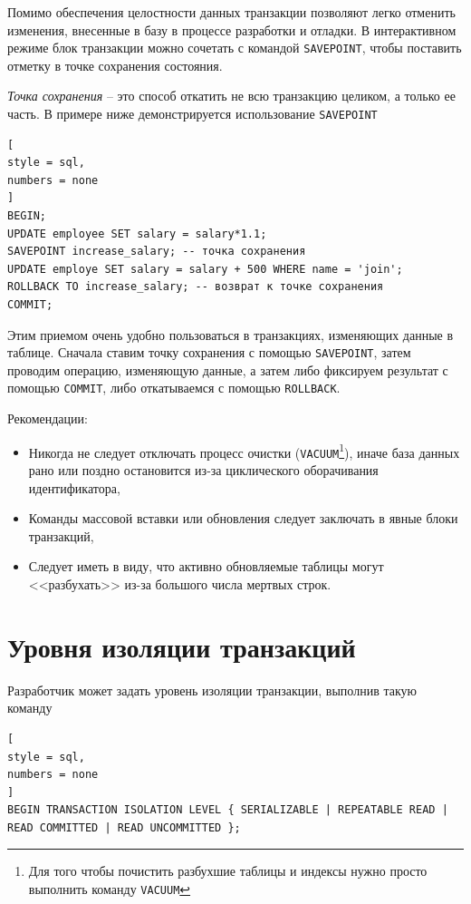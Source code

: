 \documentclass[%
	11pt,
	a4paper,
	utf8,
		]{article}
\begin{document}
Помимо обеспечения целостности данных транзакции позволяют легко отменить изменения, внесенные в базу в процессе разработки и отладки. В интерактивном режиме блок транзакции можно сочетать с командой \texttt{SAVEPOINT}, чтобы поставить отметку в точке сохранения состояния.

\emph{Точка сохранения} -- это способ откатить не всю транзакцию целиком, а только ее часть. В примере ниже демонстрируется использование \texttt{SAVEPOINT}

\begin{lstlisting}[
style = sql,
numbers = none
]
BEGIN;
UPDATE employee SET salary = salary*1.1;
SAVEPOINT increase_salary; -- точка сохранения
UPDATE employe SET salary = salary + 500 WHERE name = 'join';
ROLLBACK TO increase_salary; -- возврат к точке сохранения
COMMIT;
\end{lstlisting}

Этим приемом очень удобно пользоваться в транзакциях, изменяющих данные в таблице. Сначала ставим точку сохранения с помощью \texttt{SAVEPOINT}, затем проводим операцию, изменяющую данные, а затем либо фиксируем результат с помощью \texttt{COMMIT}, либо откатываемся с помощью \texttt{ROLLBACK}.

Рекомендации:
\begin{itemize}
	\item Никогда не следует отключать процесс очистки (\texttt{VACUUM}\footnote{Для того чтобы почистить разбухшие таблицы и индексы нужно просто выполнить команду \texttt{VACUUM}}), иначе база данных рано или поздно остановится из-за циклического оборачивания идентификатора,
	
	\item Команды массовой вставки или обновления следует заключать в явные блоки транзакций,
	
	\item Следует иметь в виду, что активно обновляемые таблицы могут <<разбухать>> из-за большого числа мертвых строк.
\end{itemize}

\section{Уровня изоляции транзакций}

Разработчик может задать уровень изоляции транзакции, выполнив такую команду 
\begin{lstlisting}[
style = sql,
numbers = none
]
BEGIN TRANSACTION ISOLATION LEVEL { SERIALIZABLE | REPEATABLE READ | READ COMMITTED | READ UNCOMMITTED };
\end{lstlisting}
\end{document}
